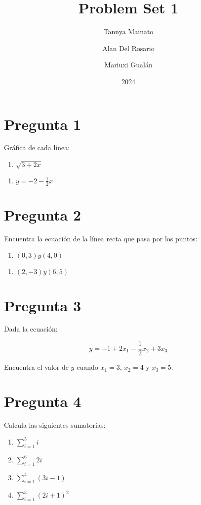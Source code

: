 \documentclass[]{article}
\title{Problem Set 1}
\author{Tannya Mainato \and Alan Del Rosario \and Mariuxi Gualán}
\date{2024}
\begin{document}
\maketitle
\section*{Pregunta 1}

Gráfica de cada línea:

\begin{enumerate}[label=\alph*)]
	\item $\sqrt{3+2x}$ 
\end{enumerate}

\begin{enumerate}[label=\alph*)]
	\item $y=-2-\frac{1}{2}x$
\end{enumerate}

\section*{Pregunta 2}
Encuentra la ecuación de la línea recta que pasa por los puntos:

\begin{enumerate} [label=\alph*)]
	\item $(0,3) y (4,0)$
\end{enumerate}



\begin{enumerate} [label=\alph*)]
	\item $(2,-3) y (6,5)$
\end{enumerate}
 
\section*{Pregunta 3}
Dada la ecuación: 

$$y=-1+2x_1-\frac{1}{2}x_2+3x_3$$

Encuentra el valor de $y$ cuando $x_1=3$, $x_2=4$ y $x_3=5$.

\section*{Pregunta 4}
Calcula las siguientes sumatorias:

\begin{enumerate}[label=(\alph*)]
	\item $\sum_{i=1}^{5}i$
	\item $\sum_{i=1}^{6}2i$
	\item $\sum_{i=1}^{4}(3i-1)$	
	\item $\sum_{i=1}^{3}(2i+1)^2$	
\end{enumerate}
\end{document}
